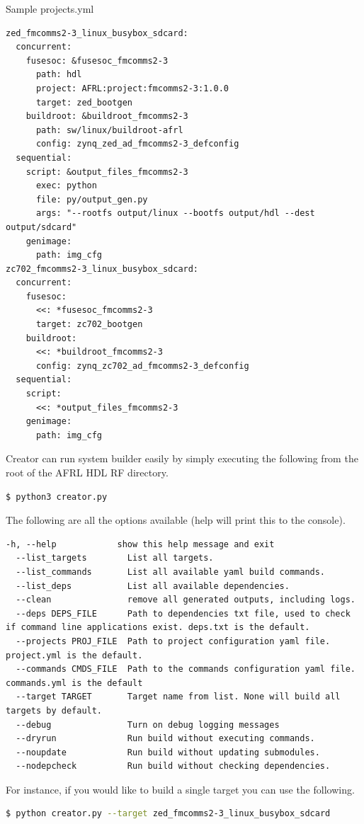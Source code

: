 Sample projects.yml
\begin{lstlisting}[language={}]
zed_fmcomms2-3_linux_busybox_sdcard:
  concurrent:
    fusesoc: &fusesoc_fmcomms2-3
      path: hdl
      project: AFRL:project:fmcomms2-3:1.0.0
      target: zed_bootgen
    buildroot: &buildroot_fmcomms2-3
      path: sw/linux/buildroot-afrl
      config: zynq_zed_ad_fmcomms2-3_defconfig
  sequential:
    script: &output_files_fmcomms2-3
      exec: python
      file: py/output_gen.py
      args: "--rootfs output/linux --bootfs output/hdl --dest output/sdcard"
    genimage:
      path: img_cfg
zc702_fmcomms2-3_linux_busybox_sdcard:
  concurrent:
    fusesoc:
      <<: *fusesoc_fmcomms2-3
      target: zc702_bootgen
    buildroot:
      <<: *buildroot_fmcomms2-3
      config: zynq_zc702_ad_fmcomms2-3_defconfig
  sequential:
    script:
      <<: *output_files_fmcomms2-3
    genimage:
      path: img_cfg
\end{lstlisting}

\par
Creator can run system builder easily by simply executing the following from the root of the AFRL HDL RF directory.
\begin{lstlisting}[language=bash]
$ python3 creator.py
\end{lstlisting}
The following are all the options available (\textendash help will print this to the console).
\begin{lstlisting}[language={}]
  -h, --help            show this help message and exit
  --list_targets        List all targets.
  --list_commands       List all available yaml build commands.
  --list_deps           List all available dependencies.
  --clean               remove all generated outputs, including logs.
  --deps DEPS_FILE      Path to dependencies txt file, used to check if command line applications exist. deps.txt is the default.
  --projects PROJ_FILE  Path to project configuration yaml file. project.yml is the default.
  --commands CMDS_FILE  Path to the commands configuration yaml file. commands.yml is the default
  --target TARGET       Target name from list. None will build all targets by default.
  --debug               Turn on debug logging messages
  --dryrun              Run build without executing commands.
  --noupdate            Run build without updating submodules.
  --nodepcheck          Run build without checking dependencies.
\end{lstlisting}
For instance, if you would like to build a single target you can use the following.
\begin{lstlisting}[language=bash]
$ python creator.py --target zed_fmcomms2-3_linux_busybox_sdcard
\end{lstlisting}

